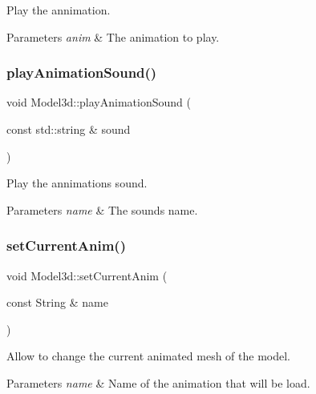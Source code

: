 Play the annimation. 


\begin{DoxyParams}{Parameters}
{\em anim} & The animation to play. \\
\hline
\end{DoxyParams}
\mbox{\label{classModel3d_a6ce79286c43bd4a6852c544bdad8ee18}} 
\subsubsection{\texorpdfstring{play\+Animation\+Sound()}{playAnimationSound()}}
{\footnotesize\ttfamily void Model3d\+::play\+Animation\+Sound (\begin{DoxyParamCaption}\item[{const std\+::string \&}]{sound }\end{DoxyParamCaption})}



Play the annimation\textquotesingle{}s sound. 


\begin{DoxyParams}{Parameters}
{\em name} & The sound\textquotesingle{}s name. \\
\hline
\end{DoxyParams}
\mbox{\label{classModel3d_a29eeaa6769b0c21268f4704ac2d404b7}} 
\subsubsection{\texorpdfstring{set\+Current\+Anim()}{setCurrentAnim()}}
{\footnotesize\ttfamily void Model3d\+::set\+Current\+Anim (\begin{DoxyParamCaption}\item[{const String \&}]{name }\end{DoxyParamCaption})}



Allow to change the current animated mesh of the model. 


\begin{DoxyParams}{Parameters}
{\em name} & Name of the animation that will be load. \\
\hline
\end{DoxyParams}
\mbox{\label{classModel3d_a971b77ce978903443e71187ceafa1528}} 
